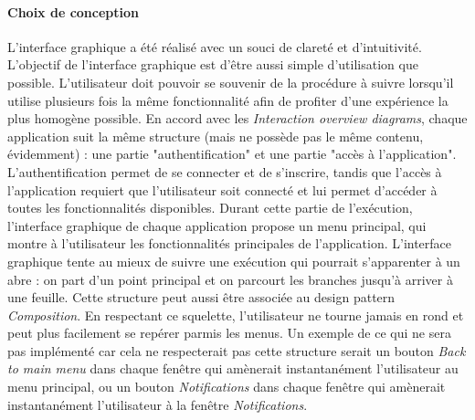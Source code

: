 \paragraph{Choix de conception} L'interface graphique a été réalisé avec un souci de clareté et d'intuitivité. L'objectif de l'interface graphique est d'être aussi simple d'utilisation que possible. L'utilisateur doit pouvoir se souvenir de la procédure à suivre lorsqu'il utilise plusieurs fois la même fonctionnalité afin de profiter d'une expérience la plus homogène possible. En accord avec les \emph{Interaction overview diagrams}, chaque application suit la même structure (mais ne possède pas le même contenu, évidemment) : une partie "authentification" et une partie "accès à l'application". L'authentification permet de se connecter et de s'inscrire, tandis que l'accès à l'application requiert que l'utilisateur soit connecté et lui permet d'accéder à toutes les fonctionnalités disponibles. Durant cette partie de l'exécution, l'interface graphique de chaque application propose un menu principal, qui montre à l'utilisateur les fonctionnalités principales de l'application. L'interface graphique tente au mieux de suivre une exécution qui pourrait s'apparenter à un abre : on part d'un point principal et on parcourt les branches jusqu'à arriver à une feuille. Cette structure peut aussi être associée au design pattern \emph{Composition}. En respectant ce squelette, l'utilisateur ne tourne jamais en rond et peut plus facilement se repérer parmis les menus. Un exemple de ce qui ne sera pas implémenté car cela ne respecterait pas cette structure serait un bouton \emph{Back to main menu} dans chaque fenêtre qui amènerait instantanément l'utilisateur au menu principal, ou un bouton \emph{Notifications} dans chaque fenêtre qui amènerait instantanément l'utilisateur à la fenêtre \emph{Notifications}.